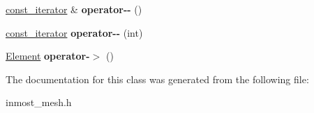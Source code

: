 \begin{DoxyCompactItemize}
\item 
\hypertarget{classINMOST_1_1Storage_1_1reference__array_1_1const__iterator_a748977953b2a355cf4e7573d87e9398a}{\hyperlink{classINMOST_1_1Storage_1_1reference__array_1_1const__iterator}{const\-\_\-iterator} \& {\bfseries operator-\/-\/} ()}\label{classINMOST_1_1Storage_1_1reference__array_1_1const__iterator_a748977953b2a355cf4e7573d87e9398a}

\item 
\hypertarget{classINMOST_1_1Storage_1_1reference__array_1_1const__iterator_a0fe8966d0be2bd5f28283cfe187ed363}{\hyperlink{classINMOST_1_1Storage_1_1reference__array_1_1const__iterator}{const\-\_\-iterator} {\bfseries operator-\/-\/} (int)}\label{classINMOST_1_1Storage_1_1reference__array_1_1const__iterator_a0fe8966d0be2bd5f28283cfe187ed363}

\item 
\hypertarget{classINMOST_1_1Storage_1_1reference__array_1_1const__iterator_a9b315882528e3aed264dd976b2d76d2f}{\hyperlink{classINMOST_1_1Element}{Element} {\bfseries operator-\/$>$} ()}\label{classINMOST_1_1Storage_1_1reference__array_1_1const__iterator_a9b315882528e3aed264dd976b2d76d2f}

\end{DoxyCompactItemize}


The documentation for this class was generated from the following file\-:\begin{DoxyCompactItemize}
\item 
inmost\-\_\-mesh.\-h\end{DoxyCompactItemize}
